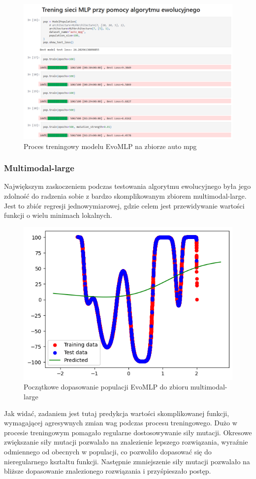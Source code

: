 \documentclass{article}
\begin{document}
\begin{figure}[H]
    \centering
    \includegraphics[width=\textwidth]{img/ae3/auto_mpg_training.png}
    \caption{Proces treningowy modelu EvoMLP na zbiorze auto mpg}
\end{figure}
\newpage

\subsubsection*{Multimodal-large}
Największym zaskoczeniem podczas testowania algorytmu ewolucyjnego była jego zdolność do radzenia sobie z bardzo skomplikowanym zbiorem multimodal-large. Jest to zbiór regresji jednowymiarowej, gdzie celem jest przewidywanie wartości funkcji o wielu minimach lokalnych.
\begin{figure}[H]
    \centering
    \includegraphics[width=\textwidth]{img/ae3/mml1.png}
    \caption{Początkowe dopasowanie populacji EvoMLP do zbioru multimodal-large}
\end{figure}
Jak widać, zadaniem jest tutaj predykcja wartości skomplikowanej funkcji, wymagającej agresywnych zmian wag podczas procesu treningowego. Dużo w procesie treningowym pomagało regularne dostosowywanie siły mutacji. Okresowe zwiększanie siły mutacji pozwalało na znalezienie lepszego rozwiązania, wyraźnie odmiennego od obecnych w populacji, co pozwoliło dopasować się do nieregularnego kształtu funkcji.
Następnie zmniejszenie siły mutacji pozwalało na bliższe dopasowanie znalezionego rozwiązania i przyśpieszało postęp.
\end{document}
